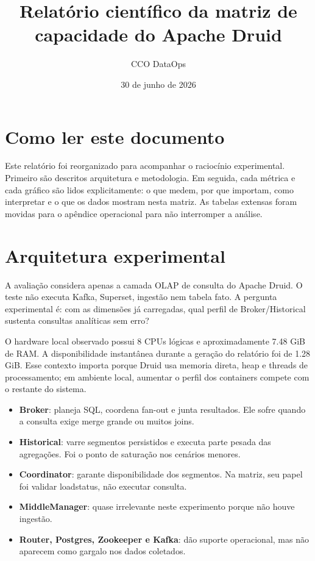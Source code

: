 \documentclass[11pt,a4paper]{article}
\title{Relatório científico da matriz de capacidade do Apache Druid}
\author{CCO DataOps}
\date{30 de junho de 2026}
\begin{document}
\maketitle


\section{Como ler este documento}

Este relatório foi reorganizado para acompanhar o raciocínio experimental. Primeiro são descritos arquitetura e metodologia. Em seguida, cada métrica e cada gráfico são lidos explicitamente: o que medem, por que importam, como interpretar e o que os dados mostram nesta matriz. As tabelas extensas foram movidas para o apêndice operacional para não interromper a análise.

\section{Arquitetura experimental}

A avaliação considera apenas a camada OLAP de consulta do Apache Druid. O teste não executa Kafka, Superset, ingestão nem tabela fato. A pergunta experimental é: com as dimensões já carregadas, qual perfil de Broker/Historical sustenta consultas analíticas sem erro?

O hardware local observado possui 8 CPUs lógicas e aproximadamente 7.48 GiB de RAM. A disponibilidade instantânea durante a geração do relatório foi de 1.28 GiB. Esse contexto importa porque Druid usa memoria direta, heap e threads de processamento; em ambiente local, aumentar o perfil dos containers compete com o restante do sistema.

\begin{itemize}

\item \textbf{Broker}: planeja SQL, coordena fan-out e junta resultados. Ele sofre quando a consulta exige merge grande ou muitos joins.

\item \textbf{Historical}: varre segmentos persistidos e executa parte pesada das agregações. Foi o ponto de saturação nos cenários menores.

\item \textbf{Coordinator}: garante disponibilidade dos segmentos. Na matriz, seu papel foi validar loadstatus, não executar consulta.

\item \textbf{MiddleManager}: quase irrelevante neste experimento porque não houve ingestão.

\item \textbf{Router, Postgres, Zookeeper e Kafka}: dão suporte operacional, mas não aparecem como gargalo nos dados coletados.

\end{itemize}
\end{document}
